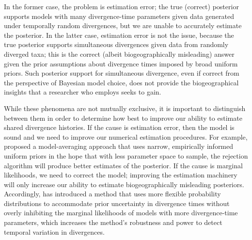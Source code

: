In the former case, the problem is estimation error; the true (correct)
posterior supports models with many divergence-time parameters given data
generated under temporally random divergences, but we are unable to accurately
estimate the posterior.
In the latter case, estimation error is not the issue, because the true
posterior supports simultaneous divergences given data from randomly diverged
taxa; this is the correct (albeit biogeographically misleading) answer given
the prior assumptions about divergence times imposed by broad uniform priors.
Such posterior support for simultaneous divergence, even if correct from the
perspective of Bayesian model choice, does not provide the biogeographical
insights that a researcher who employs \msb seeks to gain.

While these phenomena are not mutually exclusive, it is important to
distinguish between them in order to determine how best to improve our ability
to estimate shared divergence histories.
If the cause is estimation error, then the model is sound and we need to
improve our numerical estimation procedures.
For example, \citet{Hickerson2013} proposed a model-averaging approach that
uses narrow, empirically informed uniform priors in the hope that with less
parameter space to sample, the rejection algorithm will produce better
estimates of the posterior.
If the cause is marginal likelihoods, we need to correct the model; improving
the estimation machinery will only increase our ability to estimate
biogeographically misleading posteriors.
Accordingly, \citet{Oaks2014dpp} has introduced a method that uses more
flexible probability distributions to accommodate prior uncertainty in
divergence times without overly inhibiting the marginal likelihoods of models
with more divergence-time parameters, which increases the method's robustness
and power to detect temporal variation in divergences.

